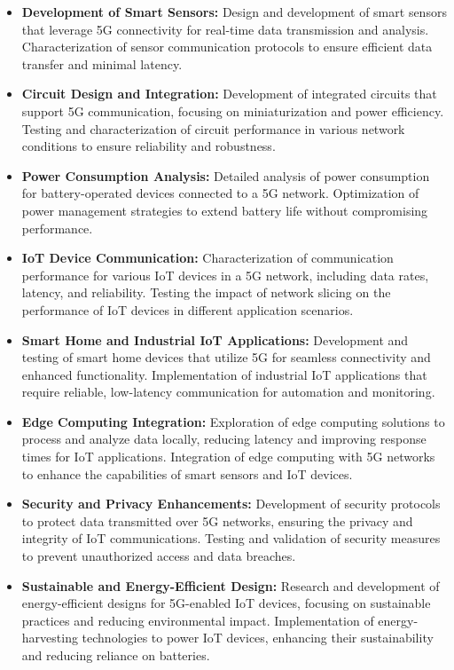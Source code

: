 \documentclass{report}
\begin{document}
\begin{itemize}
	
\item \textbf{Development of Smart Sensors:} Design and development of smart sensors that leverage 5G connectivity for real-time data transmission and analysis. Characterization of sensor communication protocols to ensure efficient data transfer and minimal latency.
\item \textbf{Circuit Design and Integration:} Development of integrated circuits that support 5G communication, focusing on miniaturization and power efficiency. Testing and characterization of circuit performance in various network conditions to ensure reliability and robustness.
\item \textbf{Power Consumption Analysis:} Detailed analysis of power consumption for battery-operated devices connected to a 5G network. Optimization of power management strategies to extend battery life without compromising performance.
\item \textbf{IoT Device Communication:} Characterization of communication performance for various IoT devices in a 5G network, including data rates, latency, and reliability. Testing the impact of network slicing on the performance of IoT devices in different application scenarios.
\item \textbf{Smart Home and Industrial IoT Applications:} Development and testing of smart home devices that utilize 5G for seamless connectivity and enhanced functionality. Implementation of industrial IoT applications that require reliable, low-latency communication for automation and monitoring.
\item \textbf{Edge Computing Integration:} Exploration of edge computing solutions to process and analyze data locally, reducing latency and improving response times for IoT applications. Integration of edge computing with 5G networks to enhance the capabilities of smart sensors and IoT devices.
\item \textbf{Security and Privacy Enhancements:} Development of security protocols to protect data transmitted over 5G networks, ensuring the privacy and integrity of IoT communications. Testing and validation of security measures to prevent unauthorized access and data breaches.
\item \textbf{Sustainable and Energy-Efficient Design:} Research and development of energy-efficient designs for 5G-enabled IoT devices, focusing on sustainable practices and reducing environmental impact. Implementation of energy-harvesting technologies to power IoT devices, enhancing their sustainability and reducing reliance on batteries.
\end{itemize}
\end{document}
